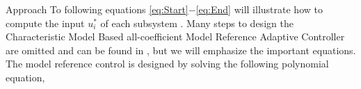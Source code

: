 \begin{section}{Approach}
To following equations \eqref{eq:Start}$-$\eqref{eq:End} will illustrate how to compute the input $u^*_i$ of each subsystem . Many steps to design the Characteristic Model Based all-coefficient Model Reference Adaptive Controller are omitted and can be found in \cite{tao2003adaptive,Goodwin1643720}, but we will emphasize the important equations. The model reference control is designed by solving the following polynomial equation,

\end{section}
